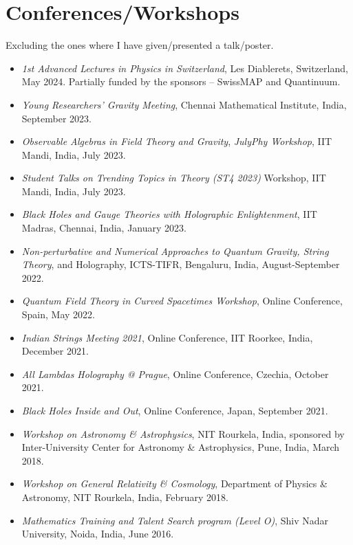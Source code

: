 \documentclass[11pt, letterpaper]{article}
\begin{document}
	\section{Conferences/Workshops}
	Excluding the ones where I have given/presented a talk/poster.
	\begin{itemize}
		\item \textit{1st Advanced Lectures in Physics in Switzerland}, Les Diablerets, Switzerland, May 2024. Partially funded by the sponsors -- SwissMAP and Quantinuum.
		
		\item \textit{Young Researchers' Gravity Meeting}, Chennai Mathematical Institute, India, September 2023.
		
		\item \textit{Observable Algebras in Field Theory and Gravity}, \textit{JulyPhy Workshop}, IIT Mandi, India, July 2023.
		
		\item \textit{Student Talks on Trending Topics in Theory (ST4 2023)} Workshop, IIT Mandi, India, July 2023.
		
		\item \textit{Black Holes and Gauge Theories with Holographic Enlightenment}, IIT Madras, Chennai, India, January 2023.
		
		\item \textit{Non-perturbative and Numerical Approaches to Quantum Gravity, String Theory}, and Holography, ICTS-TIFR, Bengaluru, India, August-September 2022.
		
		\item \textit{Quantum Field Theory in Curved Spacetimes Workshop}, Online Conference, Spain, May 2022.
		
		\item \textit{Indian Strings Meeting 2021}, Online Conference, IIT Roorkee, India, December 2021.
		
		\item \textit{All Lambdas Holography @ Prague}, Online Conference, Czechia, October 2021.
		
		\item \textit{Black Holes Inside and Out}, Online Conference, Japan, September 2021.
		
		\item\textit{Workshop on Astronomy \& Astrophysics}, NIT Rourkela, India, sponsored by Inter-University Center for Astronomy \& Astrophysics, Pune, India, March 2018.
		
		\item \textit{Workshop on General Relativity \& Cosmology}, Department of Physics \& Astronomy, NIT Rourkela, India, February 2018.
		
		\item \textit{Mathematics Training and Talent Search program (Level O)}, Shiv Nadar University, Noida, India, June 2016.
	\end{itemize}
	
\end{document}
